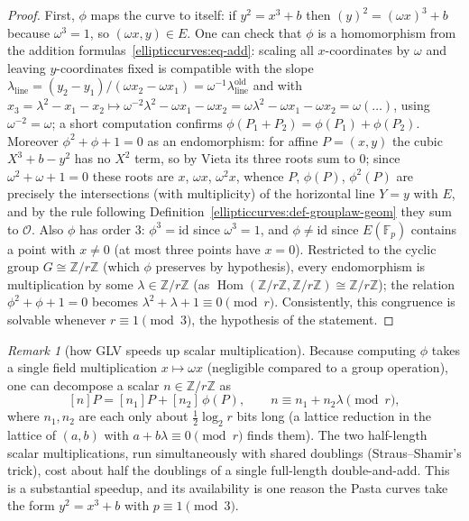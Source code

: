 \documentclass[11pt,a4paper]{article}
\theoremstyle{definition}
\theoremstyle{remark}
\newtheorem{remark}[theorem]{Remark}
\newcommand{\Z}{\ensuremath{\mathbb{Z}}}
\newcommand{\Fp}{\ensuremath{\mathbb{F}_{p}}}
\DeclareMathOperator{\Hom}{Hom}
\begin{document}
\begin{proof}
First, \(\phi\) maps the curve to itself: if \(y^2 = x^3 + b\) then \((y)^2 = (\omega x)^3 + b\) because \(\omega^3 = 1\), so \((\omega x, y) \in E\). One can check that \(\phi\) is a homomorphism from the addition formulas~\eqref{ellipticcurves:eq-add}: scaling all \(x\)-coordinates by \(\omega\) and leaving \(y\)-coordinates fixed is compatible with the slope \(\lambda_{\mathrm{line}} = (y_2 - y_1)/(\omega x_2 - \omega x_1) = \omega^{-1}\lambda_{\mathrm{line}}^{\mathrm{old}}\) and with \(x_3 = \lambda^2 - x_1 - x_2 \mapsto \omega^{-2} \lambda^2 - \omega x_1 - \omega x_2 = \omega\lambda^2 - \omega x_1 - \omega x_2 = \omega(\ldots)\), using \(\omega^{-2} = \omega\); a short computation confirms \(\phi(P_1 + P_2) = \phi(P_1) + \phi(P_2)\). Moreover \(\phi^2 + \phi + 1 = 0\) as an endomorphism: for affine \(P = (x, y)\) the cubic \(X^3 + b - y^2\) has no \(X^2\) term, so by Vieta its three roots sum to \(0\); since \(\omega^2 + \omega + 1 = 0\) these roots are \(x\), \(\omega x\), \(\omega^2 x\), whence \(P\), \(\phi(P)\), \(\phi^2(P)\) are precisely the intersections (with multiplicity) of the horizontal line \(Y = y\) with \(E\), and by the rule following Definition~\ref{ellipticcurves:def-grouplaw-geom} they sum to \(\mathcal{O}\). Also \(\phi\) has order \(3\): \(\phi^3 = \mathrm{id}\) since \(\omega^3 = 1\), and \(\phi \neq \mathrm{id}\) since \(E(\Fp)\) contains a point with \(x \neq 0\) (at most three points have \(x = 0\)). Restricted to the cyclic group \(G \cong \Z/r\Z\) (which \(\phi\) preserves by hypothesis), every endomorphism is multiplication by some \(\lambda \in \Z/r\Z\) (as \(\Hom(\Z/r\Z, \Z/r\Z) \cong \Z/r\Z\)); the relation \(\phi^2 + \phi + 1 = 0\) becomes \(\lambda^2 + \lambda + 1 \equiv 0 \pmod r\). Consistently, this congruence is solvable whenever \(r \equiv 1 \pmod 3\), the hypothesis of the statement.
\end{proof}

\begin{remark}[how GLV speeds up scalar multiplication]\label{ellipticcurves:rem-glv-speedup}
Because computing \(\phi\) takes a single field multiplication \(x \mapsto \omega x\) (negligible compared to a group operation), one can decompose a scalar \(n \in \Z/r\Z\) as
\[
  [n]P = [n_1]P + [n_2]\,\phi(P), \qquad n \equiv n_1 + n_2\lambda \pmod r,
\]
where \(n_1, n_2\) are each only about \(\frac{1}{2}\log_2 r\) bits long (a lattice reduction in the lattice of \((a, b)\) with \(a + b\lambda \equiv 0 \pmod r\) finds them). The two half-length scalar multiplications, run simultaneously with shared doublings (Straus--Shamir's trick), cost about half the doublings of a single full-length double-and-add. This is a substantial speedup, and its availability is one reason the Pasta curves take the form \(y^2 = x^3 + b\) with \(p \equiv 1 \pmod 3\).
\end{remark}
\end{document}
